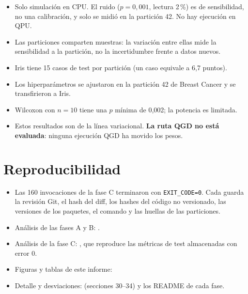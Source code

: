 \documentclass[11pt,a4paper]{article}
\begin{document}
\begin{warnbox}[Limitaciones]
\begin{itemize}[leftmargin=*]
  \item Solo simulación en CPU. El ruido ($p=0{,}001$, lectura 2\,\%) es de sensibilidad, no una calibración, y solo se
        midió en la partición 42. No hay ejecución en QPU.
  \item Las particiones comparten muestras: la variación entre ellas mide la sensibilidad a la partición, no la
        incertidumbre frente a datos nuevos.
  \item Iris tiene 15 casos de test por partición (un caso equivale a 6,7 puntos).
  \item Los hiperparámetros se ajustaron en la partición 42 de Breast Cancer y se transfirieron a Iris.
  \item Wilcoxon con $n=10$ tiene una $p$ mínima de 0,002; la potencia es limitada.
  \item Estos resultados son de la línea variacional. \textbf{La ruta QGD no está evaluada}: ninguna ejecución QGD ha movido los pesos.
\end{itemize}
\end{warnbox}

\section{Reproducibilidad}

\begin{itemize}
  \item Las 160 invocaciones de la fase C terminaron con \texttt{EXIT\_CODE=0}. Cada  guarda la
        revisión Git, el hash del diff, los hashes del código no versionado, las versiones de los paquetes, el comando y
        las huellas de las particiones.
  \item Análisis de las fases A y B: .
  \item Análisis de la fase C: , que reproduce las métricas de test
        almacenadas con error 0.
  \item Figuras y tablas de este informe:\\
  \item Detalle y desviaciones:  (secciones 30--34) y los README de cada fase.
\end{itemize}
\end{document}
